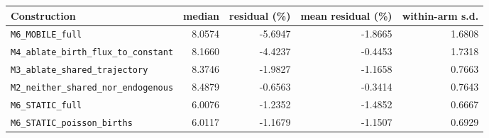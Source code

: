 \begin{center}
\small
\begin{tabular}{lrrrr}
\toprule
Construction & median & residual (\%) & mean residual (\%) & within-arm s.d. \\ \midrule
\texttt{M6\_\allowbreak{}MOBILE\_\allowbreak{}full} & 8.0574 & -5.6947 & -1.8665 & 1.6808 \\
\texttt{M4\_\allowbreak{}ablate\_\allowbreak{}birth\_\allowbreak{}flux\_\allowbreak{}to\_\allowbreak{}constant} & 8.1660 & -4.4237 & -0.4453 & 1.7318 \\
\texttt{M3\_\allowbreak{}ablate\_\allowbreak{}shared\_\allowbreak{}trajectory} & 8.3746 & -1.9827 & -1.1658 & 0.7663 \\
\texttt{M2\_\allowbreak{}neither\_\allowbreak{}shared\_\allowbreak{}nor\_\allowbreak{}endogenous} & 8.4879 & -0.6563 & -0.3414 & 0.7643 \\
\texttt{M6\_\allowbreak{}STATIC\_\allowbreak{}full} & 6.0076 & -1.2352 & -1.4852 & 0.6667 \\
\texttt{M6\_\allowbreak{}STATIC\_\allowbreak{}poisson\_\allowbreak{}births} & 6.0117 & -1.1679 & -1.1507 & 0.6929 \\
\bottomrule
\end{tabular}
\end{center}
